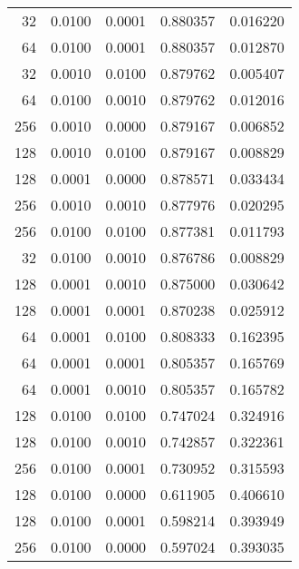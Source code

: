 \begin{tabular}{rrrrr}
  32 &  0.0100 &  0.0001 &  0.880357 &  0.016220 \\
  64 &  0.0100 &  0.0001 &  0.880357 &  0.012870 \\
  32 &  0.0010 &  0.0100 &  0.879762 &  0.005407 \\
  64 &  0.0100 &  0.0010 &  0.879762 &  0.012016 \\
 256 &  0.0010 &  0.0000 &  0.879167 &  0.006852 \\
 128 &  0.0010 &  0.0100 &  0.879167 &  0.008829 \\
 128 &  0.0001 &  0.0000 &  0.878571 &  0.033434 \\
 256 &  0.0010 &  0.0010 &  0.877976 &  0.020295 \\
 256 &  0.0100 &  0.0100 &  0.877381 &  0.011793 \\
  32 &  0.0100 &  0.0010 &  0.876786 &  0.008829 \\
 128 &  0.0001 &  0.0010 &  0.875000 &  0.030642 \\
 128 &  0.0001 &  0.0001 &  0.870238 &  0.025912 \\
  64 &  0.0001 &  0.0100 &  0.808333 &  0.162395 \\
  64 &  0.0001 &  0.0001 &  0.805357 &  0.165769 \\
  64 &  0.0001 &  0.0010 &  0.805357 &  0.165782 \\
 128 &  0.0100 &  0.0100 &  0.747024 &  0.324916 \\
 128 &  0.0100 &  0.0010 &  0.742857 &  0.322361 \\
 256 &  0.0100 &  0.0001 &  0.730952 &  0.315593 \\
 128 &  0.0100 &  0.0000 &  0.611905 &  0.406610 \\
 128 &  0.0100 &  0.0001 &  0.598214 &  0.393949 \\
 256 &  0.0100 &  0.0000 &  0.597024 &  0.393035 \\
\bottomrule
\end{tabular}
